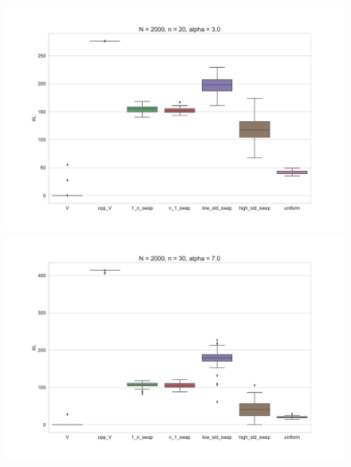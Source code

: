 \documentclass[11pt, oneside]{article}   	%
\begin{document}
\begin{figure}[h!]
\begin{minipage}[t]{.23\textwidth}
		\end{minipage}
		\hfill
		\begin{minipage}[t]{.23\textwidth}
			\centering
			\includegraphics[width=\textwidth]{figures/theorem2_2/N2000n20alpha3.pdf}
			
		\end{minipage} 
		\begin{minipage}[t]{.23\textwidth}
			\centering
			\includegraphics[width=\textwidth]{figures/theorem2_2/N2000n30alpha7.pdf}
			

\end{minipage}
\end{figure}
\end{document}
